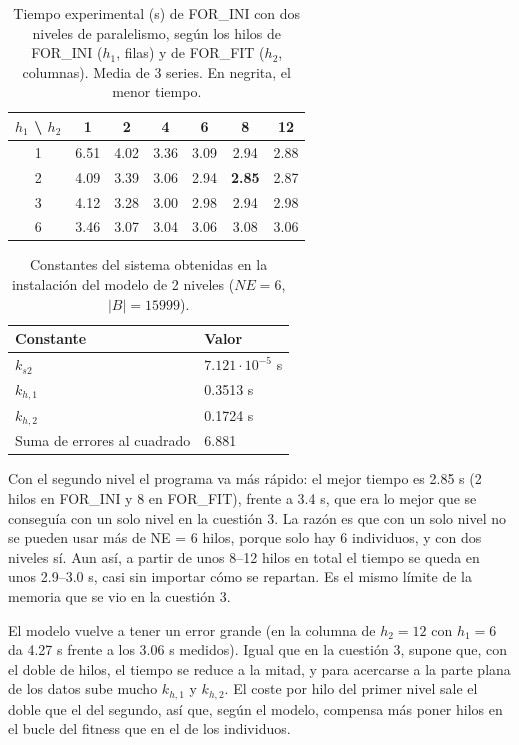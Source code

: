 \documentclass[12pt]{article}
\begin{document}
\begin{enumerate}
\begin{table}[htbp]
\centering
\begin{tabular}{c|cccccc}
\toprule
\textbf{$h_1$ \textbackslash{} $h_2$} & \textbf{1} & \textbf{2} & \textbf{4} & \textbf{6} & \textbf{8} & \textbf{12} \\
\midrule
1 & 6.51 & 4.02 & 3.36 & 3.09 & 2.94 & 2.88 \\
2 & 4.09 & 3.39 & 3.06 & 2.94 & \textbf{2.85} & 2.87 \\
3 & 4.12 & 3.28 & 3.00 & 2.98 & 2.94 & 2.98 \\
6 & 3.46 & 3.07 & 3.04 & 3.06 & 3.08 & 3.06 \\
\bottomrule
\end{tabular}
\caption{Tiempo experimental (s) de FOR\_INI con dos niveles de paralelismo, según los hilos de FOR\_INI ($h_1$, filas) y de FOR\_FIT ($h_2$, columnas). Media de 3 series. En negrita, el menor tiempo.}
\label{tab:c4_tiempos}
\end{table}

\begin{table}[htbp]
\centering
\begin{tabular}{ll}
\toprule
\textbf{Constante} & \textbf{Valor} \\
\midrule
$k_{s2}$ & $7.121 \cdot 10^{-5}$ s \\
$k_{h,1}$ & 0.3513 s \\
$k_{h,2}$ & 0.1724 s \\
Suma de errores al cuadrado & 6.881 \\
\bottomrule
\end{tabular}
\caption{Constantes del sistema obtenidas en la instalación del modelo de 2 niveles ($NE = 6$, $|B| = 15999$).}
\label{tab:c4_constantes}
\end{table}

Con el segundo nivel el programa va más rápido: el mejor tiempo es 2.85 s (2 hilos en FOR\_INI y 8 en FOR\_FIT), frente a 3.4 s, que era lo mejor que se conseguía con un solo nivel en la cuestión 3. La razón es que con un solo nivel no se pueden usar más de NE = 6 hilos, porque solo hay 6 individuos, y con dos niveles sí. Aun así, a partir de unos 8--12 hilos en total el tiempo se queda en unos 2.9--3.0 s, casi sin importar cómo se repartan. Es el mismo límite de la memoria que se vio en la cuestión 3.

El modelo vuelve a tener un error grande (en la columna de $h_2 = 12$ con $h_1 = 6$ da 4.27 s frente a los 3.06 s medidos). Igual que en la cuestión 3, supone que, con el doble de hilos, el tiempo se reduce a la mitad, y para acercarse a la parte plana de los datos sube mucho $k_{h,1}$ y $k_{h,2}$. El coste por hilo del primer nivel sale el doble que el del segundo, así que, según el modelo, compensa más poner hilos en el bucle del fitness que en el de los individuos.


\end{enumerate}
\end{document}
